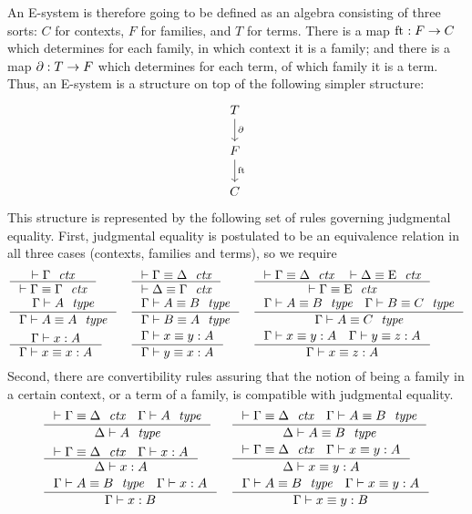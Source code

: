 An E-system is therefore going to be defined as an algebra consisting of three sorts: $C$ for contexts,
$F$ for families, and $T$ for terms. There is a map 
$\mathrm{ft}_{}:F\to C$ which determines for each family, in which context it is a
family; and there is a map $\partial_{}:T\to F$ which determines for each term, of
which family it is a term. Thus, an E-system is a structure on top of the following simpler structure:
\begin{equation*}
\begin{tikzcd}
T \arrow[d,"\ebd"] \\ F \arrow[d,"\eft"] \\ C
\end{tikzcd}
\end{equation*}
This structure is represented by the following set of rules governing judgmental
equality. First, judgmental equality is postulated to be an equivalence relation
in all three cases (contexts, families and terms), so we require
\begin{align*}
& \inference
  { \jctx{\Gamma}
    }
  { \jctxeq{\Gamma}{\Gamma}
    } 
& & \inference
    { \jctxeq{\Gamma}{\Delta}
      }
    { \jctxeq{\Delta}{\Gamma}
      } 
& & \inference
    { \jctxeq{\Gamma}{\Delta}
      \jctxeq{\Delta}{\greek{E}}
      }
    { \jctxeq{\Gamma}{\greek{E}}
      }
    \\
& \inference
  { \jfam{\Gamma}{A}
    }
  { \jfameq{\Gamma}{A}{A}
    } 
& & \inference
    { \jfameq{\Gamma}{A}{B}
      }
    { \jfameq{\Gamma}{B}{A}
      }
& & \inference
    { \jfameq{\Gamma}{A}{B}
      \jfameq{\Gamma}{B}{C}
      }
    { \jfameq{\Gamma}{A}{C}
      }
    \\
& \inference
  { \jterm{\Gamma}{A}{x}
    }
  { \jtermeq{\Gamma}{A}{x}{x}
    }
& & \inference
    { \jtermeq{\Gamma}{A}{x}{y}
      }
    { \jtermeq{\Gamma}{A}{y}{x}
      }
& & \inference
    { \jtermeq{\Gamma}{A}{x}{y}
      \jtermeq{\Gamma}{A}{y}{z}
      }
    { \jtermeq{\Gamma}{A}{x}{z}
      }
\end{align*}
Second, there are convertibility rules assuring that the notion of being a
family in a certain context, or a term of a family, is compatible with judgmental
equality.
\begin{align*}
& \inference
  { \jctxeq{\Gamma}{\Delta}
    \jfam{\Gamma}{A}
    }
  { \jfam{\Delta}{A}
    }
& & \inference
    { \jctxeq{\Gamma}{\Delta}
      \jfameq{\Gamma}{A}{B}
      }
    { \jfameq{\Delta}{A}{B}
      }
    \\
& \inference
  { \jctxeq{\Gamma}{\Delta}
    \jterm{\Gamma}{A}{x}
    }
  { \jterm{\Delta}{A}{x}
    }
& & \inference
    { \jctxeq{\Gamma}{\Delta}
      \jtermeq{\Gamma}{A}{x}{y}
      }
    { \jtermeq{\Delta}{A}{x}{y}
      }
    \\
& \inference
  { \jfameq{\Gamma}{A}{B}
    \jterm{\Gamma}{A}{x}
    }
  { \jterm{\Gamma}{B}{x}
    }
& & \inference
    { \jfameq{\Gamma}{A}{B}
      \jtermeq{\Gamma}{A}{x}{y}
      }
    { \jtermeq{\Gamma}{B}{x}{y}
      }
\end{align*}
